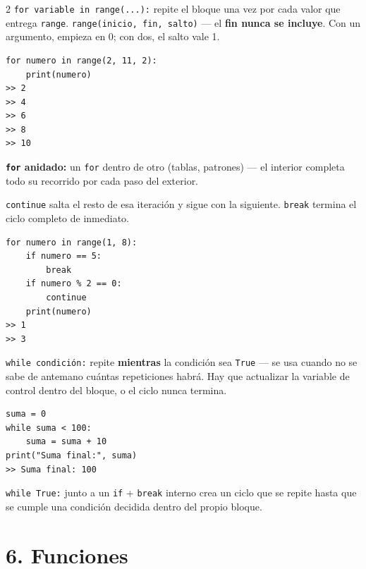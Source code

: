 \documentclass[10pt]{article}
\begin{document}
\begin{multicols}{2}
\texttt{for variable in range(...):} repite el bloque una vez por cada valor que entrega \texttt{range}. \texttt{range(inicio, fin, salto)} --- el \textbf{fin nunca se incluye}. Con un argumento, empieza en 0; con dos, el salto vale 1.

\begin{cajacodigo}
\begin{Verbatim}[fontsize=\footnotesize]
for numero in range(2, 11, 2):
    print(numero)
>> 2
>> 4
>> 6
>> 8
>> 10
\end{Verbatim}
\end{cajacodigo}

\textbf{\texttt{for} anidado:} un \texttt{for} dentro de otro (tablas, patrones) --- el interior completa todo su recorrido por cada paso del exterior.

\texttt{continue} salta el resto de esa iteración y sigue con la siguiente. \texttt{break} termina el ciclo completo de inmediato.

\begin{cajacodigo}
\begin{Verbatim}[fontsize=\footnotesize]
for numero in range(1, 8):
    if numero == 5:
        break
    if numero % 2 == 0:
        continue
    print(numero)
>> 1
>> 3
\end{Verbatim}
\end{cajacodigo}

\texttt{while condición:} repite \textbf{mientras} la condición sea \texttt{True} --- se usa cuando no se sabe de antemano cuántas repeticiones habrá. Hay que actualizar la variable de control dentro del bloque, o el ciclo nunca termina.

\begin{cajacodigo}
\begin{Verbatim}[fontsize=\footnotesize]
suma = 0
while suma < 100:
    suma = suma + 10
print("Suma final:", suma)
>> Suma final: 100
\end{Verbatim}
\end{cajacodigo}

\texttt{while True:} junto a un \texttt{if} + \texttt{break} interno crea un ciclo que se repite hasta que se cumple una condición decidida dentro del propio bloque.

\section*{6. Funciones}


\end{multicols}
\end{document}
